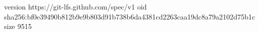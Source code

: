 version https://git-lfs.github.com/spec/v1
oid sha256:bf0e39490b812b9e9b803d91b738b6da4381cd2263caa19dc8a79a2102d75b1c
size 9515

